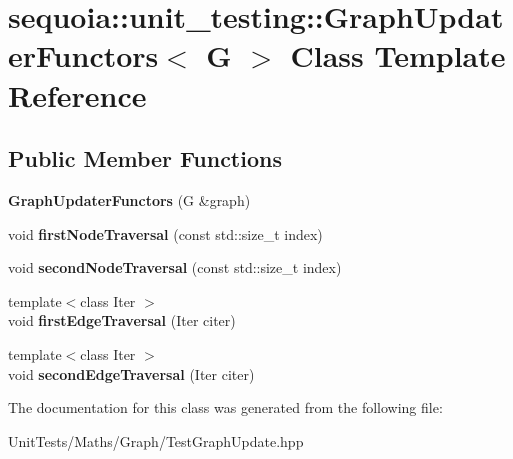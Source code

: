 \hypertarget{classsequoia_1_1unit__testing_1_1_graph_updater_functors}{}\section{sequoia\+::unit\+\_\+testing\+::Graph\+Updater\+Functors$<$ G $>$ Class Template Reference}
\label{classsequoia_1_1unit__testing_1_1_graph_updater_functors}
\subsection*{Public Member Functions}
\begin{DoxyCompactItemize}
\item 
\mbox{\label{classsequoia_1_1unit__testing_1_1_graph_updater_functors_abf83354bb8dcfb10e5b30e3915270010}} 
{\bfseries Graph\+Updater\+Functors} (G \&graph)
\item 
\mbox{\label{classsequoia_1_1unit__testing_1_1_graph_updater_functors_a5cf8d6853f2b846e0a66b861e266659d}} 
void {\bfseries first\+Node\+Traversal} (const std\+::size\+\_\+t index)
\item 
\mbox{\label{classsequoia_1_1unit__testing_1_1_graph_updater_functors_a83d58eeb29e808e90ae03096e73535c5}} 
void {\bfseries second\+Node\+Traversal} (const std\+::size\+\_\+t index)
\item 
\mbox{\label{classsequoia_1_1unit__testing_1_1_graph_updater_functors_a1b7cb465c83930f6eec02358cdb4d98d}} 
{\footnotesize template$<$class Iter $>$ }\\void {\bfseries first\+Edge\+Traversal} (Iter citer)
\item 
\mbox{\label{classsequoia_1_1unit__testing_1_1_graph_updater_functors_abfbe1f3ba63439b20d2e38dad97d84b1}} 
{\footnotesize template$<$class Iter $>$ }\\void {\bfseries second\+Edge\+Traversal} (Iter citer)
\end{DoxyCompactItemize}


The documentation for this class was generated from the following file\+:\begin{DoxyCompactItemize}
\item 
Unit\+Tests/\+Maths/\+Graph/Test\+Graph\+Update.\+hpp\end{DoxyCompactItemize}
